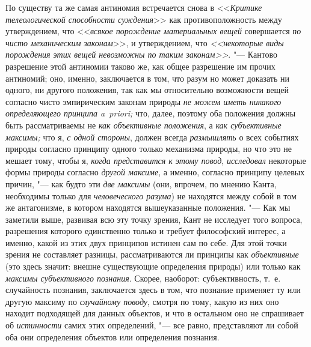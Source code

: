 По существу та же самая антиномия встречается снова в <<{\em Критике
телеологической способности суждения}>> как противоположность между
утверждением, что <<{\em всякое порождение материальных вещей} совершается
{\em по чисто механическим законам}>>, и утверждением, что
{\em <<некоторые виды порождения этих вещей невозможны по таким
законам>>}.
"--- Кантово разрешение этой антиномии таково же, как общее
разрешение им прочих антиномий; оно, именно, заключается в том, что разум
но может доказать ни одного, ни другого положения, так как мы относительно
возможности вещей согласно чисто эмпирическим законам природы
{\em не можем иметь никакого
определяющего принципа a~priori;} что, далее, поэтому оба
положения должны быть рассматриваемы не
{\em как объективные положения}, а {\em как субъективные
максимы;} что я, {\em с одной стороны}, должен всегда {\em размышлять} о всех
событиях природы согласно принципу одного только механизма природы, но что
это не мешает тому, чтобы я, {\em когда представится к этому повод},
{\em исследовал} некоторые формы природы согласно {\em другой
максиме}, а именно, согласно принципу целевых причин, "--- как будто эти
{\em две максимы} (они, впрочем, по мнению Канта, необходимы только
для {\em человеческого разума})
не находятся между собой в том же антагонизме, в котором
находятся вышеуказанные положения. "--- Как мы заметили выше,
развивая всю эту точку зрения, Кант не исследует того вопроса, разрешения
которого единственно только и требует философский интерес, а именно, какой
из этих двух принципов истинен сам по себе. Для этой точки зрения не
составляет разницы, рассматриваются ли принципы как {\em объективные} (это
здесь значит: внешне существующие определения природы) или только как
{\em максимы субъективного познания}.
Скорее, наоборот: субъективность, т.~е. случайность познания,
заключается здесь в том, что познание применяет ту или другую максиму по
{\em случайному поводу}, смотря по тому, какую из них оно находит подходящей
для данных объектов, и что в остальном оно не спрашивает об {\em истинности}
самих этих определений, "--- все равно, представляют ли собой оба они
определения объектов или определения познания.

